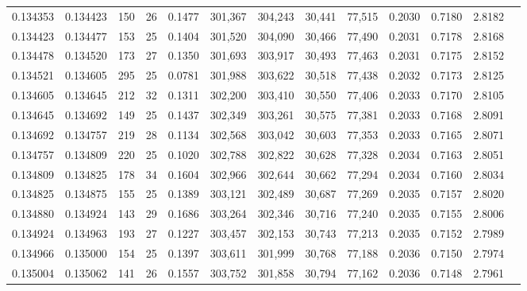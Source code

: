 \begin{tabular}{rrrrrrrrrrrrr}
0.134353 & 0.134423 & 150 &  26 &                                     0.1477 & 301,367 & 304,243 &  30,441 &  77,515 & 0.2030 & 0.7180 & 2.8182 \\
0.134423 & 0.134477 & 153 &  25 &                                     0.1404 & 301,520 & 304,090 &  30,466 &  77,490 & 0.2031 & 0.7178 & 2.8168 \\
0.134478 & 0.134520 & 173 &  27 &                                     0.1350 & 301,693 & 303,917 &  30,493 &  77,463 & 0.2031 & 0.7175 & 2.8152 \\
0.134521 & 0.134605 & 295 &  25 &                                     0.0781 & 301,988 & 303,622 &  30,518 &  77,438 & 0.2032 & 0.7173 & 2.8125 \\
0.134605 & 0.134645 & 212 &  32 &                                     0.1311 & 302,200 & 303,410 &  30,550 &  77,406 & 0.2033 & 0.7170 & 2.8105 \\
0.134645 & 0.134692 & 149 &  25 &                                     0.1437 & 302,349 & 303,261 &  30,575 &  77,381 & 0.2033 & 0.7168 & 2.8091 \\
0.134692 & 0.134757 & 219 &  28 &                                     0.1134 & 302,568 & 303,042 &  30,603 &  77,353 & 0.2033 & 0.7165 & 2.8071 \\
0.134757 & 0.134809 & 220 &  25 &                                     0.1020 & 302,788 & 302,822 &  30,628 &  77,328 & 0.2034 & 0.7163 & 2.8051 \\
0.134809 & 0.134825 & 178 &  34 &                                     0.1604 & 302,966 & 302,644 &  30,662 &  77,294 & 0.2034 & 0.7160 & 2.8034 \\
0.134825 & 0.134875 & 155 &  25 &                                     0.1389 & 303,121 & 302,489 &  30,687 &  77,269 & 0.2035 & 0.7157 & 2.8020 \\
0.134880 & 0.134924 & 143 &  29 &                                     0.1686 & 303,264 & 302,346 &  30,716 &  77,240 & 0.2035 & 0.7155 & 2.8006 \\
0.134924 & 0.134963 & 193 &  27 &                                     0.1227 & 303,457 & 302,153 &  30,743 &  77,213 & 0.2035 & 0.7152 & 2.7989 \\
0.134966 & 0.135000 & 154 &  25 &                                     0.1397 & 303,611 & 301,999 &  30,768 &  77,188 & 0.2036 & 0.7150 & 2.7974 \\
0.135004 & 0.135062 & 141 &  26 &                                     0.1557 & 303,752 & 301,858 &  30,794 &  77,162 & 0.2036 & 0.7148 & 2.7961 \\

\end{tabular}
